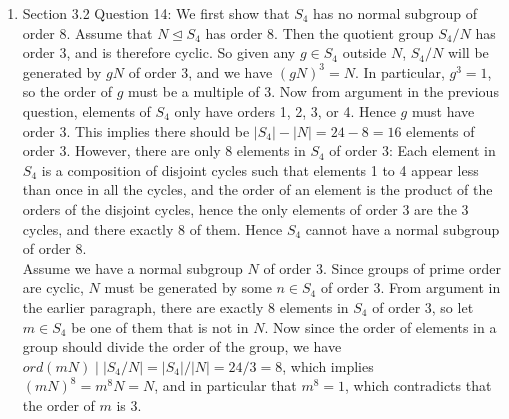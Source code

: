 \documentclass{article}
\begin{document}
\begin{enumerate}
  \item Section 3.2 Question 14: We first show that $S_4$ has no normal
    subgroup of order 8. Assume that $N\trianglelefteq S_4$ has order 8.
    Then the quotient group $S_4/N$ has order 3, and is therefore cyclic.
    So given any $g\in S_4$ outside $N$, $S_4/N$ will be generated by $gN$
    of order 3, and we have $(gN)^3=N$. In particular, $g^3=1$, so the
    order of $g$ must be a multiple of 3. Now from argument in the previous
    question, elements of $S_4$ only have orders 1, 2, 3, or 4. Hence $g$
    must have order 3. This implies there should be $|S_4|-|N|=24-8=16$
    elements of order 3. However, there are only 8 elements in $S_4$ of
    order 3: Each element in $S_4$ is a composition of disjoint cycles such
    that elements 1 to 4 appear less than once in all the cycles, and the
    order of an element is the product of the orders of the disjoint
    cycles, hence the only elements of order 3 are the 3 cycles, and there
    exactly 8 of them. Hence $S_4$ cannot have a normal subgroup of order
    8. \\

    Assume we have a normal subgroup $N$ of order 3. Since groups of prime
    order are cyclic, $N$ must be generated by some $n\in S_4$ of order 3.
    From argument in the earlier paragraph, there are exactly 8 elements in
    $S_4$ of order 3, so let $m\in S_4$ be one of them that is not in $N$.
    Now since the order of elements in a group should divide the order of
    the group, we have $ord(mN)\mid|S_4/N|=|S_4|/|N|=24/3=8$, which
    implies $(mN)^8=m^8N=N$, and in particular that $m^8=1$, which
    contradicts that the order of $m$ is 3.
\end{enumerate}
\end{document}
